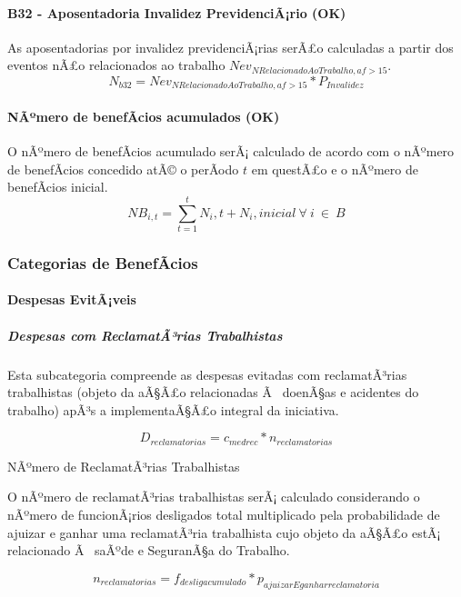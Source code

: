 \documentclass[]{article}
\let\oldparagraph\paragraph
\renewcommand{\paragraph}[1]{\oldparagraph{#1}\mbox{}}
\let\oldsubparagraph\subparagraph
\renewcommand{\subparagraph}[1]{\oldsubparagraph{#1}\mbox{}}
\begin{document}
\paragraph{B32 - Aposentadoria Invalidez PrevidenciÃ¡rio
(OK)}\label{b32---aposentadoria-invalidez-previdenciario-ok}

As aposentadorias por invalidez previdenciÃ¡rias serÃ£o calculadas a
partir dos eventos nÃ£o relacionados ao trabalho
\(Nev_{NRelacionadoAoTrabalho, af>15}\).
\[N_{b32} = Nev_{NRelacionadoAoTrabalho, af>15} * P_{Invalidez}\]

\paragraph{NÃºmero de benefÃ­cios acumulados
(OK)}\label{namero-de-benefacios-acumulados-ok}

O nÃºmero de benefÃ­cios acumulado serÃ¡ calculado de acordo com o
nÃºmero de benefÃ­cios concedido atÃ© o perÃ­odo \(t\) em questÃ£o e o
nÃºmero de benefÃ­cios inicial.
\[NB_{i,t} = \sum_{t=1}^{t} N_i,t + N_i,inicial \ \forall \ i \  \in \ B\]

\subsubsection{Categorias de
BenefÃ­cios}\label{categorias-de-benefacios}

\paragraph{Despesas EvitÃ¡veis}\label{despesas-evitaveis}

\subparagraph{Despesas com ReclamatÃ³rias
Trabalhistas}\label{despesas-com-reclamatarias-trabalhistas}

Esta subcategoria compreende as despesas evitadas com reclamatÃ³rias
trabalhistas (objeto da aÃ§Ã£o relacionadas Ã~ doenÃ§as e acidentes do
trabalho) apÃ³s a implementaÃ§Ã£o integral da iniciativa.

\[{D}_{reclamatorias} = c_{medrec}*n_{reclamatorias} \]

NÃºmero de ReclamatÃ³rias Trabalhistas

O nÃºmero de reclamatÃ³rias trabalhistas serÃ¡ calculado considerando o
nÃºmero de funcionÃ¡rios desligados total multiplicado pela
probabilidade de ajuizar e ganhar uma reclamatÃ³ria trabalhista cujo
objeto da aÃ§Ã£o estÃ¡ relacionado Ã~ saÃºde e SeguranÃ§a do Trabalho.

\[n_{reclamatorias} = f_{desligacumulado} * p_{ajuizarEganharreclamatoria} \]
\end{document}
